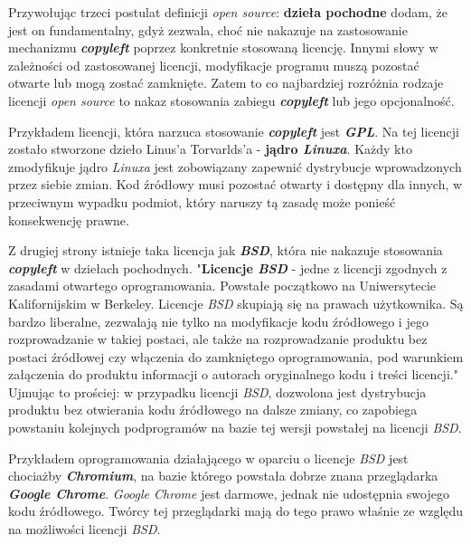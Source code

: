 \documentclass{article}
\begin{document}
Przywołując trzeci postulat definicji \emph{open source}: \textbf{dzieła pochodne} dodam, że jest on fundamentalny, gdyż zezwala, choć nie nakazuje na zastosowanie mechanizmu \textbf{\emph{copyleft}} poprzez konkretnie stosowaną licencję. Innymi słowy w zależności od zastosowanej licencji, modyfikacje programu muszą pozostać otwarte lub mogą zostać zamknięte. Zatem to co najbardziej rozróżnia rodzaje licencji \emph{open source} to nakaz stosowania zabiegu \textbf{\emph{copyleft}} lub jego opcjonalność.

Przykładem licencji, która narzuca stosowanie \textbf{\emph{copyleft}} jest \textbf{\emph{GPL}}. Na tej licencji zostało stworzone dzieło Linus'a Torvarlds'a -  \textbf{jądro \emph{Linuxa}}. Każdy kto zmodyfikuje jądro \emph{Linuxa} jest zobowiązany zapewnić dystrybucje wprowadzonych przez siebie zmian. Kod źródłowy musi pozostać otwarty i dostępny dla innych, w przeciwnym wypadku podmiot, który naruszy tą zasadę może ponieść konsekwencję prawne.

Z drugiej strony istnieje taka licencja jak \textbf{\emph{BSD}}, która nie nakazuje stosowania \textbf{\emph{copyleft}} w dziełach pochodnych. "\textbf{Licencje \emph{BSD}} - jedne z licencji zgodnych z zasadami otwartego oprogramowania. Powstałe początkowo na Uniwersytecie Kalifornijskim w Berkeley. Licencje \emph{BSD} skupiają się na prawach użytkownika. Są bardzo liberalne, zezwalają nie tylko na modyfikacje kodu źródłowego i jego rozprowadzanie w takiej postaci, ale także na rozprowadzanie produktu bez postaci źródłowej czy włączenia do zamkniętego oprogramowania, pod warunkiem załączenia do produktu informacji o autorach oryginalnego kodu i treści licencji\cite{wikipedia3}." Ujmując to prościej: w przypadku licencji \emph{BSD}, dozwolona jest dystrybucja produktu bez otwierania kodu źródłowego na dalsze zmiany, co zapobiega powstaniu kolejnych podprogramów na bazie tej wersji powstałej na licencji \emph{BSD}.

Przykładem oprogramowania działającego w oparciu o licencje \emph{BSD} jest chociażby \textbf{\emph{Chromium}}, na bazie którego powstała dobrze znana przeglądarka \textbf{\emph{Google Chrome}}. \emph{Google Chrome} jest darmowe, jednak nie udostępnia swojego kodu źródłowego. Twórcy tej przeglądarki mają do tego prawo właśnie ze względu na możliwości licencji \emph{BSD}\cite{wikipedia3}. 
\end{document}
